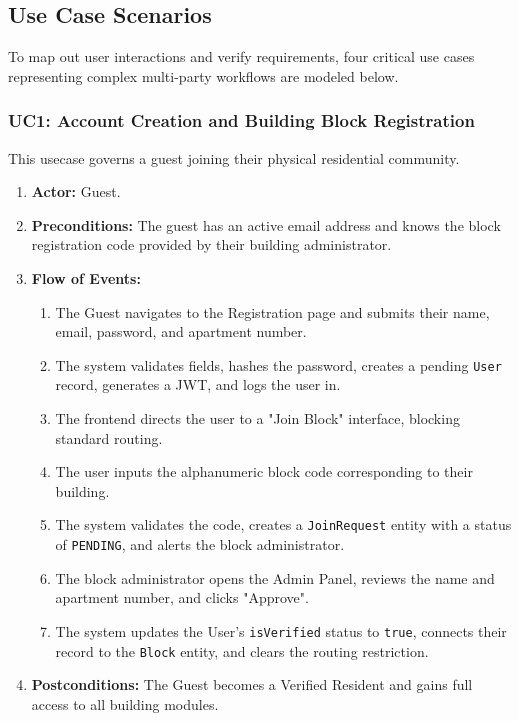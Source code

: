 \subsection{Use Case Scenarios}
To map out user interactions and verify requirements, four critical use cases representing complex multi-party workflows are modeled below.

\subsubsection{UC1: Account Creation and Building Block Registration}
This usecase governs a guest joining their physical residential community.
\begin{enumerate}
    \item \textbf{Actor:} Guest.
    \item \textbf{Preconditions:} The guest has an active email address and knows the block registration code provided by their building administrator.
    \item \textbf{Flow of Events:}
    \begin{enumerate}
        \item The Guest navigates to the Registration page and submits their name, email, password, and apartment number.
        \item The system validates fields, hashes the password, creates a pending \texttt{User} record, generates a JWT, and logs the user in.
        \item The frontend directs the user to a "Join Block" interface, blocking standard routing.
        \item The user inputs the alphanumeric block code corresponding to their building.
        \item The system validates the code, creates a \texttt{JoinRequest} entity with a status of \texttt{PENDING}, and alerts the block administrator.
        \item The block administrator opens the Admin Panel, reviews the name and apartment number, and clicks "Approve".
        \item The system updates the User's \texttt{isVerified} status to \texttt{true}, connects their record to the \texttt{Block} entity, and clears the routing restriction.
    \end{enumerate}
    \item \textbf{Postconditions:} The Guest becomes a Verified Resident and gains full access to all building modules.
\end{enumerate}

